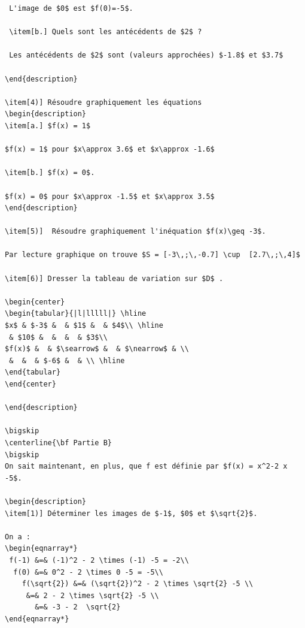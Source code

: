 {\begin{multicols}{2}
\begin{verbatim}
 L'image de $0$ est $f(0)=-5$.
 
 \item[b.] Quels sont les antécédents de $2$ ?
 
 Les antécédents de $2$ sont (valeurs approchées) $-1.8$ et $3.7$
 
\end{description}

\item[4)] Résoudre graphiquement les équations 
\begin{description}
\item[a.] $f(x) = 1$

$f(x) = 1$ pour $x\approx 3.6$ et $x\approx -1.6$ 

\item[b.] $f(x) = 0$.

$f(x) = 0$ pour $x\approx -1.5$ et $x\approx 3.5$ 
\end{description}

\item[5)]  Résoudre graphiquement l'inéquation $f(x)\geq -3$.

Par lecture graphique on trouve $S = [-3\,;\,-0.7] \cup  [2.7\,;\,4]$

\item[6)] Dresser la tableau de variation sur $D$ .

\begin{center}
\begin{tabular}{|l|lllll|} \hline
$x$ & $-3$ &  & $1$ &  & $4$\\ \hline
 & $10$ &  &  &  & $3$\\ 
$f(x)$ &  & $\searrow$ &  & $\nearrow$ & \\
 &  &  & $-6$ &  & \\ \hline
\end{tabular}
\end{center}

\end{description}

\bigskip
\centerline{\bf Partie B}
\bigskip
On sait maintenant, en plus, que f est définie par $f(x) = x^2-2 x -5$.

\begin{description}
\item[1)] Déterminer les images de $-1$, $0$ et $\sqrt{2}$.

On a : 
\begin{eqnarray*}
 f(-1) &=& (-1)^2 - 2 \times (-1) -5 = -2\\
  f(0) &=& 0^2 - 2 \times 0 -5 = -5\\
    f(\sqrt{2}) &=& (\sqrt{2})^2 - 2 \times \sqrt{2} -5 \\
     &=& 2 - 2 \times \sqrt{2} -5 \\
       &=& -3 - 2  \sqrt{2}  
\end{eqnarray*}


\end{verbatim}
\end{multicols}}
